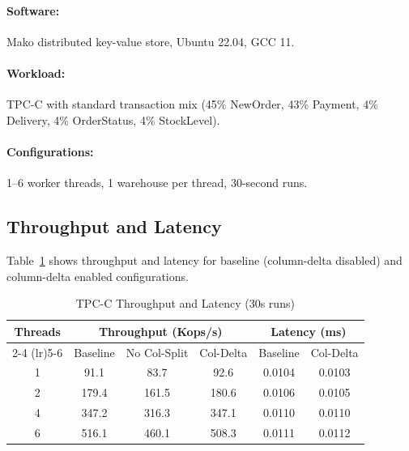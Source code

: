 \documentclass[letterpaper,twocolumn,10pt]{article}
\begin{document}
\paragraph{Software:} Mako distributed key-value store, Ubuntu 22.04, GCC 11.

\paragraph{Workload:} TPC-C with standard transaction mix (45\% NewOrder, 43\% Payment, 4\% Delivery, 4\% OrderStatus, 4\% StockLevel).

\paragraph{Configurations:} 1--6 worker threads, 1 warehouse per thread, 30-second runs.

\subsection{Throughput and Latency}

Table~\ref{tab:throughput} shows throughput and latency for baseline (column-delta disabled) and column-delta enabled configurations.

\begin{table}[t]
\centering
\caption{TPC-C Throughput and Latency (30s runs)}
\label{tab:throughput}
\begin{tabular}{cccccc}
\toprule
Threads & \multicolumn{3}{c}{Throughput (Kops/s)} & \multicolumn{2}{c}{Latency (ms)} \\
\cmidrule(lr){2-4} \cmidrule(lr){5-6}
& Baseline & No Col-Split & Col-Delta & Baseline & Col-Delta \\
\midrule
1 & 91.1 & 83.7 & 92.6 & 0.0104 & 0.0103 \\
2 & 179.4 & 161.5 & 180.6 & 0.0106 & 0.0105 \\
4 & 347.2 & 316.3 & 347.1 & 0.0110 & 0.0110 \\
6 & 516.1 & 460.1 & 508.3 & 0.0111 & 0.0112 \\
\bottomrule
\end{tabular}
\end{table}
\end{document}
